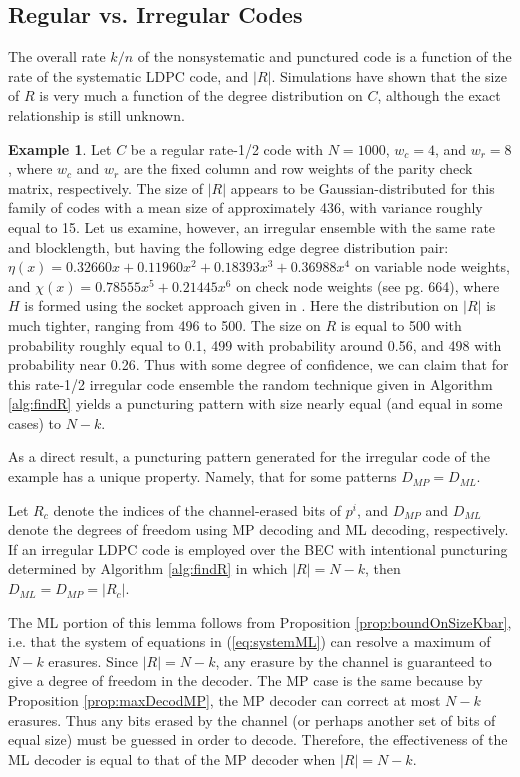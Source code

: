 \documentclass[10pt,twocolumn,twoside]{IEEEtran} \newlength{\pic}
\theoremstyle{definition}
\newtheorem{example}{Example}
\theoremstyle{remark}
\theoremstyle{plain}
\begin{document}
\subsection{Regular vs. Irregular Codes}\label{subsec:regVsIrreg}

The overall rate $k/n$ of the nonsystematic and punctured code is a function of the rate of the systematic LDPC code, and $|R|$. Simulations have shown that the size of $R$ is very much a function of the degree distribution on $C$, although the exact relationship is still unknown.
\begin{example}\label{ex:punct}
Let $C$ be a regular rate-1/2 code with $N = 1000$, $w_c = 4$, and $w_r = 8$, where $w_c$ and $w_r$ are the fixed column and row weights of the parity check matrix, respectively. The size of $|R|$ appears to be Gaussian-distributed for this family of codes with a mean size of approximately 436, with variance roughly equal to 15. Let us examine, however, an irregular ensemble with the same rate and blocklength, but having the following edge degree distribution pair: $\eta(x) = 0.32660x + 0.11960x^2 + 0.18393x^3 + 0.36988x^4$ on variable node weights, and $\chi(x) = 0.78555x^5 + 0.21445x^6$ on check node weights (see \cite{MoonArches} pg. 664), where $H$ is formed using the socket approach given in \cite{Burshtein04}. Here the distribution on $|R|$ is much tighter, ranging from 496 to 500. The size on $R$ is equal to 500 with probability roughly equal to 0.1, 499 with probability around 0.56, and 498 with probability near 0.26. Thus with some degree of confidence, we can claim that for this rate-1/2 irregular code ensemble the random technique given in Algorithm \ref{alg:findR} yields a puncturing pattern with size nearly equal (and equal in some cases) to $N - k$.
\end{example}

As a direct result, a puncturing pattern generated for the irregular code of the example has a unique property. Namely, that for some patterns $D_{MP} = D_{ML}$.
\begin{lemma}\label{lem:degsFree}
Let $R_c$ denote the indices of the channel-erased bits of $p^i$, and $D_{MP}$ and $D_{ML}$ denote the degrees of freedom using MP decoding and ML decoding, respectively. If an irregular LDPC code is employed over the BEC with intentional puncturing determined by Algorithm \ref{alg:findR} in which $|R| = N - k$, then $D_{ML} = D_{MP} = |R_c|$.
\end{lemma}
\begin{IEEEproof} The ML portion of this lemma follows from Proposition \ref{prop:boundOnSizeKbar}, i.e. that the system of equations in (\ref{eq:systemML}) can resolve a maximum of $N - k$ erasures. Since $|R|=N-k$, any erasure by the channel is guaranteed to give a degree of freedom in the decoder. The MP case is the same because by Proposition \ref{prop:maxDecodMP}, the MP decoder can correct at most $N-k$ erasures. Thus any bits erased by the channel (or perhaps another set of bits of equal size) must be guessed in order to decode. Therefore, the effectiveness of the ML decoder is equal to that of the MP decoder when $|R|=N-k$.
\end{IEEEproof}
\end{document}
